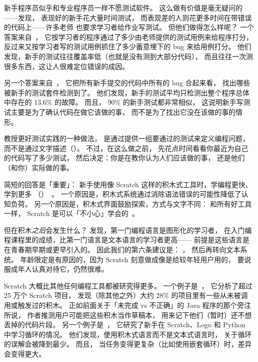 新手程序员似乎和专业程序员一样不愿测试软件。
这么做有价值是毫无疑问的——\cite{Cart2017}发现，
表现好的新手花大量时间测试，
而表现差的人则花更多时间在带错误的代码上——许多老师
也要求学习者给作业写测试。
但他们做得怎么样呢？
一个答案来自~\cite{Bria2015}，
它按学习者的程序通过了多少由老师提供的测试用例来给程序打分，
反过来又按学习者写的测试用例抓住了多少蓄意埋下的 bug 来给用例打分。
他们发现，新手的测试往往覆盖率低（也就是没有测到大部分代码），
而且往往一次测很多东西，这让人很难定位错误的成因。

另一个答案来自~\cite{Edwa2014b}，
它把所有新手提交的代码中所有的 bug 合起来看，
找出哪些被新手的测试套件检测到了。
他们发现，新手的测试平均只检测出整个程序总体中存在的 13.6\% 的故障。
而且，
90\% 的新手测试都非常相似，
这说明新手写测试主要是为了确认代码在做它该做的事，
而不是为了找出它没在该做的事的情形。

教授更好测试实践的一种做法，
是通过提供一组要通过的测试来定义编程问题，
而不是通过文字描述（）。
不过，在这么做之前，
先花点时间看看你最近为自己的代码写了多少测试，
然后决定：你是在教你认为人们应该做的事，
还是他们（和你）实际做的事。


简短的回答是「重要」：
新手使用像 Scratch 这样的积木式工具时，学编程更快、学到更多
（）~\cite{Wein2017}。
一个原因是，积木式系统通过消除语法错误的可能性降低了认知负荷。
另一个原因是，积木式界面鼓励探索，方式与文字不同：
和所有好工具一样，
Scratch 是可以「不小心」学会的~\cite{Malo2010}。

但在积木\emph{之后}会发生什么？
\cite{Chen2018}发现，第一门编程语言是图形化的学习者，
在入门编程课程里的成绩，比第一门语言是文本语言的学习者更高——
前提是这些语言是在青春期早期或更早引入的。
因此我们的第六条建议是：
，
然后再转向文本系统。
年龄限定是有原因的，因为 Scratch 刻意做成像是给较年轻用户用的，
要说服成年人认真对待它，仍然很难。


Scratch 大概比其他任何编程工具都被研究得更多。
一个例子是~\cite{Aiva2016}，
它分析了超过 25 万个 Scratch 项目，
发现（除其他之外）大约 28\% 的项目里有一些从未被调用或触发过的积木。
正如前面关于「未完成 vs 不正确」的 Java 程序的那个旁注所说，
作者推测用户可能把这些积木当作草稿本，
用来记下他们（暂时）还不想丢掉的代码片段。
另一个例子是~\cite{Grov2017,Mlad2017}，
它研究了新手在 Scratch、Logo 和 Python 中学习循环的情况。
他们发现，使用积木式语言而不是文本式语言时，
关于循环的误解会被降到最少。
而且，
当任务变得更复杂（比如使用嵌套循环）时，差异会变得更大。

